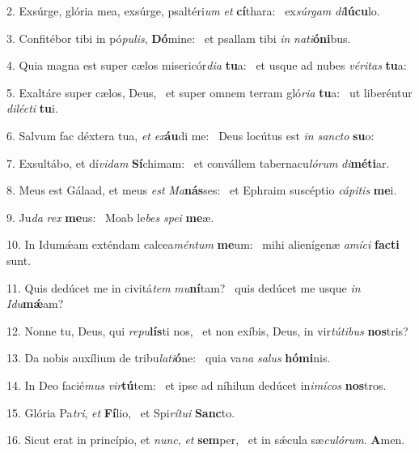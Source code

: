 2. Exsúrge, glória mea, exsúrge, psaltéri\textit{um} \textit{et} \textbf{cí}thara: \ast\  ex\textit{súr}\textit{gam} \textit{di}\textbf{lú}\textbf{cu}lo.\

3. Confitébor tibi in pó\textit{pu}\textit{lis}, \textbf{Dó}mine: \ast\  et psallam tibi \textit{in} \textit{na}\textit{ti}\textbf{ó}\textbf{ni}bus.\

4. Quia magna est super cælos misericór\textit{di}\textit{a} \textbf{tu}a: \ast\  et usque ad nubes \textit{vé}\textit{ri}\textit{tas} \textbf{tu}a:\

5. Exaltáre super cælos, Deus, \dag\  et super omnem terram gló\textit{ri}\textit{a} \textbf{tu}a: \ast\  ut liberéntur \textit{di}\textit{léc}\textit{ti} \textbf{tu}i.\

6. Salvum fac déxtera tua, \textit{et} \textit{ex}\textbf{áu}di me: \ast\  Deus locútus est \textit{in} \textit{sanc}\textit{to} \textbf{su}o:\

7. Exsultábo, et dí\textit{vi}\textit{dam} \textbf{Sí}chimam: \ast\  et convállem tabernacu\textit{ló}\textit{rum} \textit{di}\textbf{mé}\textbf{ti}ar.\

8. Meus est Gálaad, et meus \textit{est} \textit{Ma}\textbf{nás}ses: \ast\  et Ephraim suscéptio \textit{cá}\textit{pi}\textit{tis} \textbf{me}i.\

9. Ju\textit{da} \textit{rex} \textbf{me}us: \ast\  Moab le\textit{bes} \textit{spe}\textit{i} \textbf{me}æ.\

10. In Idumǽam exténdam calcea\textit{mén}\textit{tum} \textbf{me}um: \ast\  mihi alienígenæ \textit{a}\textit{mí}\textit{ci} \textbf{fac}\textbf{ti} sunt.\

11. Quis dedúcet me in civitá\textit{tem} \textit{mu}\textbf{ní}tam? \ast\  quis dedúcet me usque \textit{in} \textit{I}\textit{du}\textbf{mǽ}am?\

12. Nonne tu, Deus, qui \textit{re}\textit{pu}\textbf{lís}ti nos, \ast\  et non exíbis, Deus, in vir\textit{tú}\textit{ti}\textit{bus} \textbf{nos}tris?\

13. Da nobis auxílium de tribu\textit{la}\textit{ti}\textbf{ó}ne: \ast\  quia va\textit{na} \textit{sa}\textit{lus} \textbf{hó}\textbf{mi}nis.\

14. In Deo facié\textit{mus} \textit{vir}\textbf{tú}tem: \ast\  et ipse ad níhilum dedúcet in\textit{i}\textit{mí}\textit{cos} \textbf{nos}tros.\

15. Glória Pa\textit{tri}, \textit{et} \textbf{Fí}lio, \ast\  et Spi\textit{rí}\textit{tu}\textit{i} \textbf{Sanc}to.\

16. Sicut erat in princípio, et \textit{nunc}, \textit{et} \textbf{sem}per, \ast\  et in sǽcula sæ\textit{cu}\textit{ló}\textit{rum}. \textbf{A}men.\

